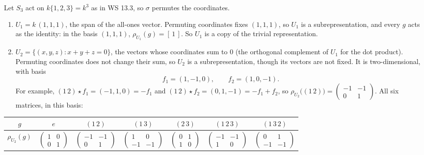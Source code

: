 \documentclass[11pt]{report}
\begin{document}
\begin{exbox}\label{ex:subrepresentations-k123}
Let $S_3$ act on $k\{1,2,3\} = k^3$ as in WS 13.3, so $\sigma$ permutes the coordinates.
\begin{enumerate}
    \item $U_1 = k\,(1,1,1)$, the span of the all-ones vector. Permuting coordinates fixes $(1,1,1)$, so $U_1$ is a subrepresentation, and every $g$ acts as the identity: in the basis $(1,1,1)$, $\rho_{U_1}(g) = [\,1\,]$. So $U_1$ is a copy of the trivial representation.
    \item $U_2 = \{(x, y, z) : x + y + z = 0\}$, the vectors whose coordinates sum to $0$ (the orthogonal complement of $U_1$ for the dot product). Permuting coordinates does not change their sum, so $U_2$ is a subrepresentation, though its vectors are not fixed. It is two-dimensional, with basis
    \[ f_1 = (1, -1, 0), \qquad f_2 = (1, 0, -1). \]
    For example, $(1\,2) \star f_1 = (-1, 1, 0) = -f_1$ and $(1\,2) \star f_2 = (0, 1, -1) = -f_1 + f_2$, so $\rho_{U_2}\big((1\,2)\big) = \left(\begin{smallmatrix} -1 & -1 \\ 0 & 1 \end{smallmatrix}\right)$. All six matrices, in this basis:
\end{enumerate}
\begin{center}
\renewcommand{\arraystretch}{1.35}\setlength{\tabcolsep}{4pt}
\begin{tabular}{c|cccccc}
$g$ & $e$ & $(1\,2)$ & $(1\,3)$ & $(2\,3)$ & $(1\,2\,3)$ & $(1\,3\,2)$ \\ \hline
$\rho_{U_2}(g)$ & $\left(\begin{smallmatrix} 1 & 0 \\ 0 & 1 \end{smallmatrix}\right)$ & $\left(\begin{smallmatrix} -1 & -1 \\ 0 & 1 \end{smallmatrix}\right)$ & $\left(\begin{smallmatrix} 1 & 0 \\ -1 & -1 \end{smallmatrix}\right)$ & $\left(\begin{smallmatrix} 0 & 1 \\ 1 & 0 \end{smallmatrix}\right)$ & $\left(\begin{smallmatrix} -1 & -1 \\ 1 & 0 \end{smallmatrix}\right)$ & $\left(\begin{smallmatrix} 0 & 1 \\ -1 & -1 \end{smallmatrix}\right)$ \\

\end{tabular}
\end{center}
\end{exbox}
\end{document}

